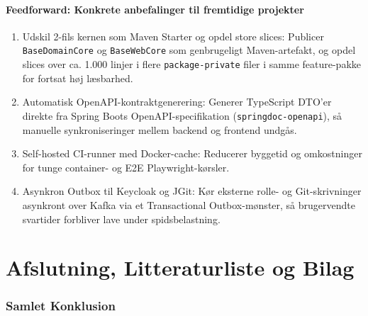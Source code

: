 \documentclass[11pt,a4paper]{article}
\begin{document}
\subsection{Feedforward: Konkrete anbefalinger til fremtidige projekter}
\begin{enumerate}[noitemsep]
    \item Udskil 2-fils kernen som Maven Starter og opdel store slices: Publicer \texttt{BaseDomainCore} og \texttt{BaseWebCore} som genbrugeligt Maven-artefakt, og opdel slices over ca. 1.000 linjer i flere \texttt{package-private} filer i samme feature-pakke for fortsat høj læsbarhed.
    \item Automatisk OpenAPI-kontraktgenerering: Generer TypeScript DTO'er direkte fra Spring Boots OpenAPI-specifikation (\texttt{springdoc-openapi}), så manuelle synkroniseringer mellem backend og frontend undgås.
    \item Self-hosted CI-runner med Docker-cache: Reducerer byggetid og omkostninger for tunge container- og E2E Playwright-kørsler.
    \item Asynkron Outbox til Keycloak og JGit: Kør eksterne rolle- og Git-skrivninger asynkront over Kafka via et Transactional Outbox-mønster, så brugervendte svartider forbliver lave under spidsbelastning.
\end{enumerate}

\newpage
\part*{Afslutning, Litteraturliste og Bilag}

\section{Samlet Konklusion}
\end{document}
